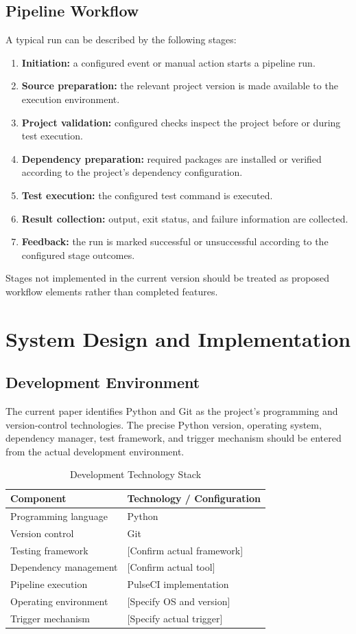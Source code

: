 \documentclass[conference]{IEEEtran}
\begin{document}
\subsection{Pipeline Workflow}
A typical run can be described by the following stages:
\begin{enumerate}
    \item \textbf{Initiation:} a configured event or manual action starts a pipeline run.
    \item \textbf{Source preparation:} the relevant project version is made available to the execution environment.
    \item \textbf{Project validation:} configured checks inspect the project before or during test execution.
    \item \textbf{Dependency preparation:} required packages are installed or verified according to the project's dependency configuration.
    \item \textbf{Test execution:} the configured test command is executed.
    \item \textbf{Result collection:} output, exit status, and failure information are collected.
    \item \textbf{Feedback:} the run is marked successful or unsuccessful according to the configured stage outcomes.
\end{enumerate}
Stages not implemented in the current version should be treated as proposed workflow elements rather than completed features.

\section{System Design and Implementation}
\subsection{Development Environment}
The current paper identifies Python and Git as the project's programming and version-control technologies. The precise Python version, operating system, dependency manager, test framework, and trigger mechanism should be entered from the actual development environment.

\begin{table}[htbp]
\centering
\caption{Development Technology Stack}
\label{tab:stack}
\begin{tabular}{p{} p{}}
\toprule
\textbf{Component} & \textbf{Technology / Configuration}\\
\midrule
Programming language & Python\\
Version control & Git\\
Testing framework & [Confirm actual framework]\\
Dependency management & [Confirm actual tool]\\
Pipeline execution & PulseCI implementation\\
Operating environment & [Specify OS and version]\\
Trigger mechanism & [Specify actual trigger]\\
\bottomrule
\end{tabular}
\end{table}
\end{document}
